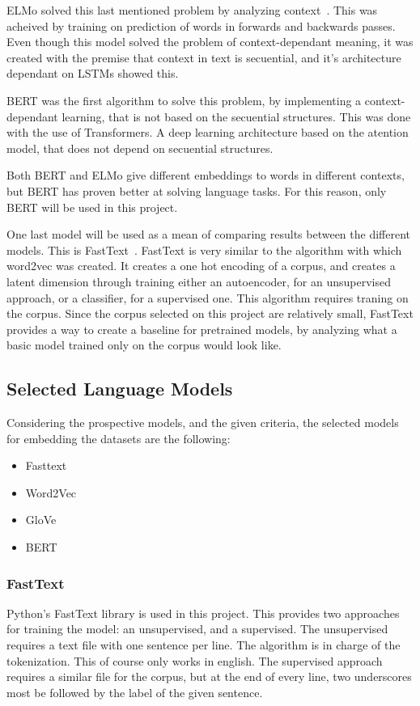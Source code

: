 ELMo solved this last mentioned problem by analyzing context~\cite{TODO}. This was acheived by training on prediction of words in forwards and backwards passes. Even though this model solved the problem of context-dependant meaning, it was created with the premise that context in text is secuential, and it's architecture dependant on LSTMs showed this.

BERT was the first algorithm to solve this problem, by implementing a context-dependant learning, that is not based on the secuential structures. This was done with the use of Transformers. A deep learning architecture based on the atention model, that does not depend on secuential structures.

Both BERT and ELMo give different embeddings to words in different contexts, but BERT has proven better at solving language tasks. For this reason, only BERT will be used in this project.

One last model will be used as a mean of comparing results between the different models. This is FastText~\cite{TODO}. FastText is very similar to the algorithm with which word2vec was created. It creates a one hot encoding of a corpus, and creates a latent dimension through training either an autoencoder, for an unsupervised approach, or a classifier, for a supervised one. This algorithm requires traning on the corpus. Since the corpus selected on this project are relatively small, FastText provides a way to create a baseline for pretrained models, by analyzing what a basic model trained only on the corpus would look like.

\subsection{Selected Language Models}\label{sub:Selected Language Models}

Considering the prospective models, and the given criteria, the selected models for embedding the datasets are the following:
\begin{itemize}
  \item Fasttext
  \item Word2Vec
  \item GloVe
  \item BERT
\end{itemize}

\subsubsection{FastText}\label{subs:FastText}
Python's FastText library\cite{TODO} is used in this project. This provides two approaches for training the model: an unsupervised, and a supervised. The unsupervised requires a text file with one sentence per line. The algorithm is in charge of the tokenization. This of course only works in english. The supervised approach requires a similar file for the corpus, but at the end of every line, two underscores most be followed by the label of the given sentence.

